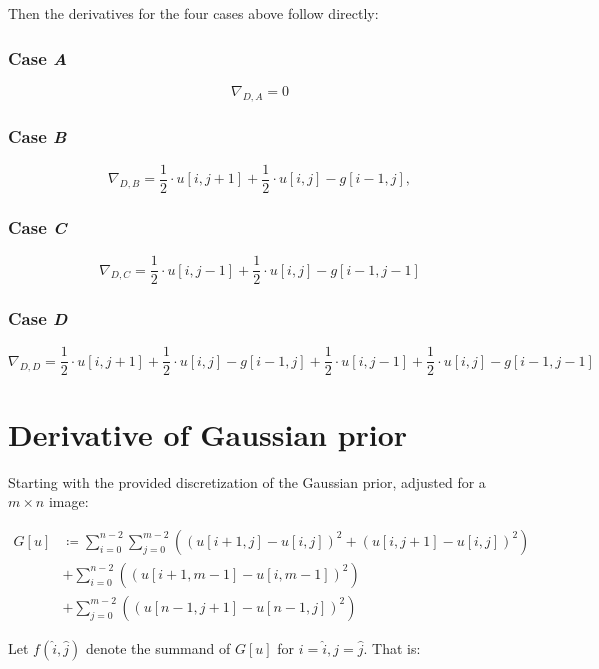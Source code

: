 \documentclass[a4paper]{scrreprt}
\begin{document}
Then the derivatives for the four cases above follow directly:

\subsubsection{Case \emph{A}}

\[
		\nabla_{D, A} = 0
\]

\subsubsection{Case \emph{B}}

\[
		\nabla_{D, B} = 
		\frac{1}{2} \cdot u[i, j + 1] + \frac{1}{2} \cdot u[i, j] - g[i - 1, j],
\]

\subsubsection{Case \emph{C}}

\[
		\nabla_{D, C} = 
		\frac{1}{2} \cdot u[i, j - 1] + \frac{1}{2} \cdot u[i, j] - g[i - 1, j - 1]
\]

\subsubsection{Case \emph{D}}

\[
		\nabla_{D, D} = 
		  \frac{1}{2} \cdot u[i, j + 1] + \frac{1}{2} \cdot u[i, j] - g[i - 1, j] + \frac{1}{2} \cdot u[i, j - 1] + \frac{1}{2} \cdot u[i, j] - g[i - 1, j - 1]
\]

\section{Derivative of Gaussian prior}

Starting with the provided discretization of the Gaussian prior, adjusted for a
$m \times n$ image:

\begin{align*}
		G[u] & \coloneqq \sum_{i=0}^{n-2} \sum_{j=0}^{m-2} \left((u[i + 1, j] - u[i, j])^2 + (u[i,j + 1] - u[i, j])^2\right) \\
			 & + \sum_{i=0}^{n-2} \left((u[i + 1, m - 1] - u[i, m - 1])^2\right) \\
			 & + \sum_{j=0}^{m-2} \left((u[n - 1, j + 1] - u[n - 1, j])^2\right)
\end{align*}

Let $f(\hat{i}, \hat{j})$ denote the summand of $G[u]$ for $i = \hat{i}, j =
\hat{j}$.  That is:
\end{document}
